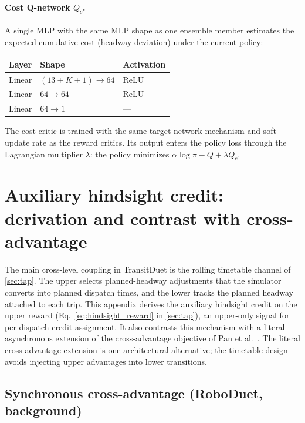 \paragraph{Cost Q-network $Q_c$.}
A single MLP with the same MLP shape as one ensemble member estimates the expected cumulative cost (headway deviation) under the current policy:
\begin{center}
\small
\begin{tabular}{lll}
\toprule
Layer & Shape & Activation \\
\midrule
Linear & $(13{+}K{+}1) \to 64$ & ReLU \\
Linear & $64 \to 64$ & ReLU \\
Linear & $64 \to 1$ & --- \\
\bottomrule
\end{tabular}
\end{center}
The cost critic is trained with the same target-network mechanism and soft update rate as the reward critics.
Its output enters the policy loss through the Lagrangian multiplier $\lambda$: the policy minimizes $\alpha \log \pi - Q + \lambda Q_c$.

\section{Auxiliary hindsight credit: derivation and contrast with cross-advantage}
\label{app:coupling_derivation}

The main cross-level coupling in TransitDuet is the rolling timetable channel of \cref{sec:tap}. The upper selects planned-headway adjustments that the simulator converts into planned dispatch times, and the lower tracks the planned headway attached to each trip. This appendix derives the auxiliary hindsight credit on the upper reward (Eq.~\ref{eq:hindsight_reward} in \cref{sec:tap}), an upper-only signal for per-dispatch credit assignment. It also contrasts this mechanism with a literal asynchronous extension of the cross-advantage objective of Pan et al.~\citep{pan2024roboduet}. The literal cross-advantage extension is one architectural alternative; the timetable design avoids injecting upper advantages into lower transitions.

\subsection{Synchronous cross-advantage (RoboDuet, background)}

